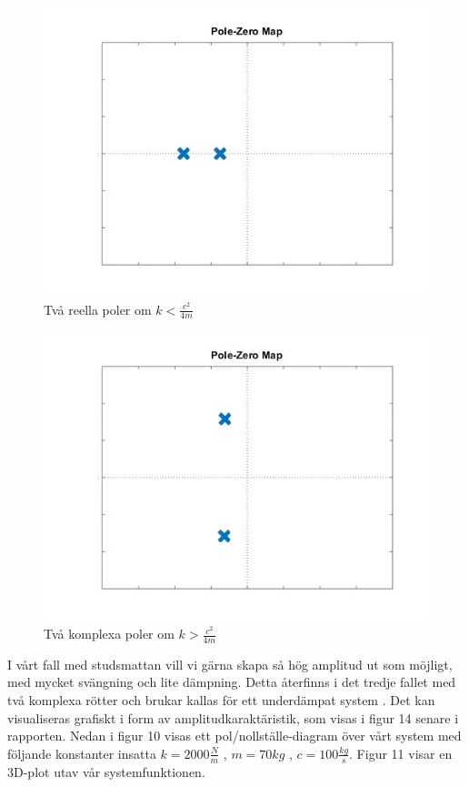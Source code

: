 \documentclass[10pt,a4paper]{article}
\begin{document}
\begin{figure}
\begin{center}
\includegraphics[scale=0.3]{2reella}
\caption{Två reella poler om $k<\frac{c^2}{4m}$}
\end{center}
\end{figure}

\begin{figure}
\begin{center}
\includegraphics[scale=0.3]{2komplexa}
\caption{Två komplexa poler om $k>\frac{c^2}{4m}$}
\end{center}
\end{figure}
\newpage


I vårt fall med studsmattan vill vi gärna skapa så hög amplitud ut som möjligt, med mycket svängning och lite dämpning. Detta återfinns i det tredje fallet med två komplexa rötter och brukar kallas för ett underdämpat system \cite{polesAndZeros}. Det kan visualiseras grafiskt i form av amplitudkaraktäristik, som visas i figur 14 senare i rapporten. Nedan i figur 10 visas ett pol/nollställe-diagram över vårt system med följande konstanter insatta $k=2000\frac{N}{m}$ , $m=70kg$ , $c=100\frac{kg}{s}$. Figur 11 visar en 3D-plot utav vår systemfunktionen.
\end{document}
